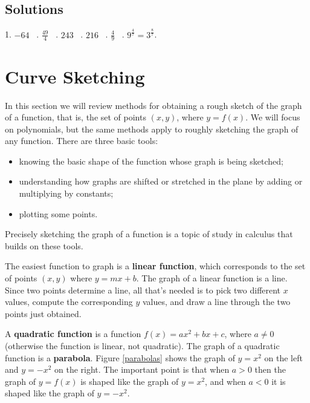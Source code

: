 \documentclass[11pt]{book}               %
\begin{document}
\subsection{Solutions} 
1.  $-64$ \  . $\frac{49}{4}$ \ .  $243$ \  .  $216$ \ . $\frac{4}{9}$ \ . $9^\frac{4}{7} = 3^\frac{8}{7}$. %

\newpage
\label{section_curve-sketching}
\section{Curve Sketching}

In this section we will review methods for obtaining a rough sketch of the graph of a function, that is, the set of points $(x, y)$, where $y = f(x)$.  
We will focus on polynomials, but the same methods apply to roughly sketching the graph of any function.
There are three basic tools:
\begin{itemize}
\item knowing the basic shape of the function whose graph is being sketched;
\item understanding how graphs are shifted or stretched in the plane by adding or multiplying by constants;
\item plotting some points.
\end{itemize}
Precisely sketching the graph of a function is a topic of study in calculus that builds on these tools.

The easiest function to graph is a \textbf{linear function}, which corresponds to the set of points $(x, y)$ where $y = mx + b$.  The graph of a linear function is a line.
Since two points determine a line, all that's needed is to pick two different $x$ values, compute the corresponding $y$ values, and draw a line through the two points just obtained.

A \textbf{quadratic function} is a function $f(x) = ax^2+bx+c$, where $a \neq 0$ (otherwise the function is linear, not quadratic).   The graph of a quadratic function is a \textbf{parabola}.
Figure \ref{parabolas} shows the graph of $y = x^2$ on the left and $y = -x^2$ on the right.
The important point is that when $a > 0$ then the graph of $y = f(x)$ is shaped like the graph of $y = x^2$, and 
when $a < 0$ it is shaped like the graph of $y = -x^2$.
\end{document}
